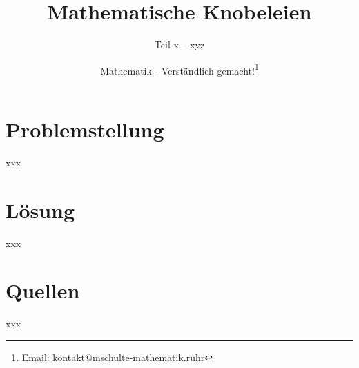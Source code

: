 \documentclass[]{scrartcl}
\title{Mathematische Knobeleien}
\subtitle{Teil x -- xyz}
\author{Mathematik - Verständlich gemacht!\footnote{Email: \href{mailto:kontakt@mschulte-mathematik.ruhr}{kontakt@mschulte-mathematik.ruhr}}}
\begin{document}
\maketitle

\section*{Problemstellung}
xxx

\section*{Lösung}
xxx

\section*{Quellen}
xxx
\end{document}
